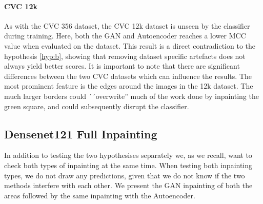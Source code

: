 \paragraph{CVC 12k}
As with the CVC 356 dataset, the CVC 12k dataset is unseen by the classifier during training. 
Here, both the GAN and Autoencoder reaches a lower MCC value when evaluated on the dataset. 
This result is a direct contradiction to the hypothesis \ref{hyp:b}, showing that removing dataset specific artefacts does not always yield better scores. 
It is important to note that there are significant differences between the two CVC datasets which can influence the results. The most prominent feature is the edges around the images in the 12k dataset. The much larger borders could  ´´overwrite'' much of the work done by inpainting the green square, and could subsequently disrupt the classifier.














































\subsection{Densenet121 Full Inpainting}

In addition to testing the two hypothesises separately we, as we recall, want to check both types of inpainting at the same time.
When testing both inpainting types, we do not draw any predictions, given that we do not know if the two methods interfere with each other. 
We present the GAN inpainting of both the areas followed by the same inpainting with the Autoencoder.


